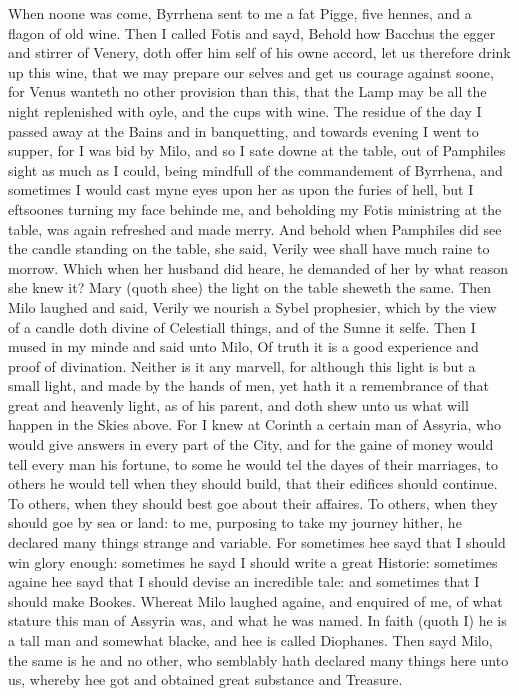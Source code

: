 When noone was come, Byrrhena sent to me a fat Pigge, five hennes, and a flagon
of old wine. Then I called Fotis and sayd, Behold how Bacchus the egger and
stirrer of Venery, doth offer him self of his owne accord, let us therefore
drink up this wine, that we may prepare our selves and get us courage against
soone, for Venus wanteth no other provision than this, that the Lamp may be all
the night replenished with oyle, and the cups with wine. The residue of the day
I passed away at the Bains and in banquetting, and towards evening I went to
supper, for I was bid by Milo, and so I sate downe at the table, out of
Pamphiles sight as much as I could, being mindfull of the commandement of
Byrrhena, and sometimes I would cast myne eyes upon her as upon the furies of
hell, but I eftsoones turning my face behinde me, and beholding my Fotis
ministring at the table, was again refreshed and made merry. And behold when
Pamphiles did see the candle standing on the table, she said, Verily wee shall
have much raine to morrow. Which when her husband did heare, he demanded of her
by what reason she knew it? Mary (quoth shee) the light on the table sheweth
the same. Then Milo laughed and said, Verily we nourish a Sybel prophesier,
which by the view of a candle doth divine of Celestiall things, and of the
Sunne it selfe. Then I mused in my minde and said unto Milo, Of truth it is a
good experience and proof of divination. Neither is it any marvell, for
although this light is but a small light, and made by the hands of men, yet
hath it a remembrance of that great and heavenly light, as of his parent, and
doth shew unto us what will happen in the Skies above. For I knew at Corinth a
certain man of Assyria, who would give answers in every part of the City, and
for the gaine of money would tell every man his fortune, to some he would tel
the dayes of their marriages, to others he would tell when they should build,
that their edifices should continue. To others, when they should best goe
about their affaires. To others, when they should goe by sea or land: to me,
purposing to take my journey hither, he declared many things strange and
variable. For sometimes hee sayd that I should win glory enough: sometimes he
sayd I should write a great Historie: sometimes againe hee sayd that I should
devise an incredible tale: and sometimes that I should make Bookes. Whereat
Milo laughed againe, and enquired of me, of what stature this man of Assyria
was, and what he was named. In faith (quoth I) he is a tall man and somewhat
blacke, and hee is called Diophanes. Then sayd Milo, the same is he and no
other, who semblably hath declared many things here unto us, whereby hee got
and obtained great substance and Treasure.

